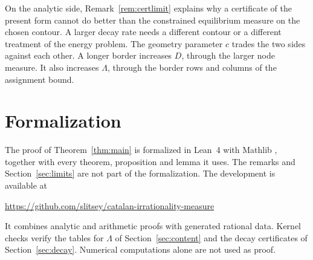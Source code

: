 \documentclass[11pt]{amsart}
\newcommand{\FormalizationURL}{https://github.com/slitsey/catalan-irrationality-measure}
\newcommand{\FormalizationLink}{\url{\FormalizationURL}}
\theoremstyle{definition}
\theoremstyle{remark}
\numberwithin{equation}{section}
\begin{document}
On the analytic side, Remark~\ref{rem:certlimit} explains why a certificate of the present form cannot do better than the
constrained equilibrium measure on the chosen contour. A larger decay rate needs a different contour or a different
treatment of the energy problem. The geometry parameter $c$ trades the two sides against each other. A longer border
increases $D$, through the larger node measure. It also increases $\Lambda$, through the border rows and columns of the
assignment bound.

\section{Formalization}\label{sec:lean}
\raggedbottom

The proof of Theorem~\ref{thm:main} is formalized in Lean~4 \cite{Lean4} with Mathlib \cite{Mathlib}, together with every
theorem, proposition and lemma it uses. The remarks and Section~\ref{sec:limits} are not part of the formalization. The
development is available at
\begin{center}
\FormalizationLink
\end{center}
It combines analytic and arithmetic proofs with generated rational data. Kernel checks verify the tables for $\Lambda$ of
Section~\ref{sec:content} and the decay certificates of Section~\ref{sec:decay}. Numerical computations alone are not
used as proof.
\end{document}

